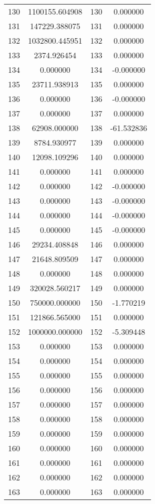 \documentclass[12pt]{article}
\begin{document}
\begin{longtable}{@{}cccc@{}}
130 & 1100155.604908 & 130 & 0.000000 \\
131 & 147229.388075 & 131 & 0.000000 \\
132 & 1032800.445951 & 132 & 0.000000 \\
133 & 2374.926454 & 133 & 0.000000 \\
134 & 0.000000 & 134 & -0.000000 \\
135 & 23711.938913 & 135 & 0.000000 \\
136 & 0.000000 & 136 & -0.000000 \\
137 & 0.000000 & 137 & 0.000000 \\
138 & 62908.000000 & 138 & -61.532836 \\
139 & 8784.930977 & 139 & 0.000000 \\
140 & 12098.109296 & 140 & 0.000000 \\
141 & 0.000000 & 141 & 0.000000 \\
142 & 0.000000 & 142 & -0.000000 \\
143 & 0.000000 & 143 & -0.000000 \\
144 & 0.000000 & 144 & -0.000000 \\
145 & 0.000000 & 145 & -0.000000 \\
146 & 29234.408848 & 146 & 0.000000 \\
147 & 21648.809509 & 147 & 0.000000 \\
148 & 0.000000 & 148 & 0.000000 \\
149 & 320028.560217 & 149 & 0.000000 \\
150 & 750000.000000 & 150 & -1.770219 \\
151 & 121866.565000 & 151 & 0.000000 \\
152 & 1000000.000000 & 152 & -5.309448 \\
153 & 0.000000 & 153 & 0.000000 \\
154 & 0.000000 & 154 & 0.000000 \\
155 & 0.000000 & 155 & 0.000000 \\
156 & 0.000000 & 156 & 0.000000 \\
157 & 0.000000 & 157 & 0.000000 \\
158 & 0.000000 & 158 & 0.000000 \\
159 & 0.000000 & 159 & 0.000000 \\
160 & 0.000000 & 160 & 0.000000 \\
161 & 0.000000 & 161 & 0.000000 \\
162 & 0.000000 & 162 & 0.000000 \\
163 & 0.000000 & 163 & 0.000000 \\

\end{longtable}
\end{document}
